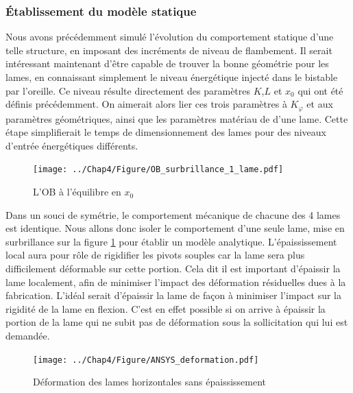 		\subsubsection{Établissement du modèle statique} 
	Nous avons précédemment simulé l'évolution du comportement statique d'une telle structure, en imposant des incréments de niveau de flambement. Il serait intéressant maintenant d'être capable de trouver la bonne géométrie pour les lames, en connaissant simplement le niveau énergétique injecté dans le bistable par l'oreille. Ce niveau résulte directement des paramètres $K$,$L$ et $x_0$ qui ont été définis précédemment. On aimerait alors lier ces trois paramètres à $K_{\varphi}$ et aux paramètres géométriques, ainsi que les paramètres matériau de d'une lame. Cette étape simplifierait le temps de dimensionnement des lames pour des niveaux d'entrée énergétiques différents.\\
\begin{figure}[!htbp]
\begin{center}
    \captionsetup{justification=centering}
	\texttt{[image: ../Chap4/Figure/OB\_surbrillance\_1\_lame.pdf]}
	\caption{L'OB à l'équilibre en $x_0$}
	\label{fig:OB_surbrillance_1_lame}
\end{center}
\end{figure}
Dans un souci de symétrie, le comportement mécanique de chacune des 4 lames est identique. Nous allons donc isoler le comportement d'une seule lame, mise en surbrillance sur la figure \ref{fig:OB_surbrillance_1_lame} pour établir un modèle analytique.
L'épaississement local aura pour rôle de rigidifier les pivots souples car la lame sera plus difficilement déformable sur cette portion. Cela dit il est important d'épaissir la lame localement, afin de minimiser l'impact des déformation résiduelles dues à la fabrication. L'idéal serait d'épaissir la lame de façon à minimiser l'impact sur la rigidité de la lame en flexion. C'est en effet possible si on arrive à épaissir la portion de la lame qui ne subit pas de déformation sous la sollicitation qui lui est demandée.
\begin{figure}[!htbp]
\begin{center}
    \captionsetup{justification=centering}
	\texttt{[image: ../Chap4/Figure/ANSYS\_deformation.pdf]}
	\caption{Déformation des lames horizontales sans épaississement}
	\label{fig:ANSYS_deformation}
\end{center}
\end{figure}
